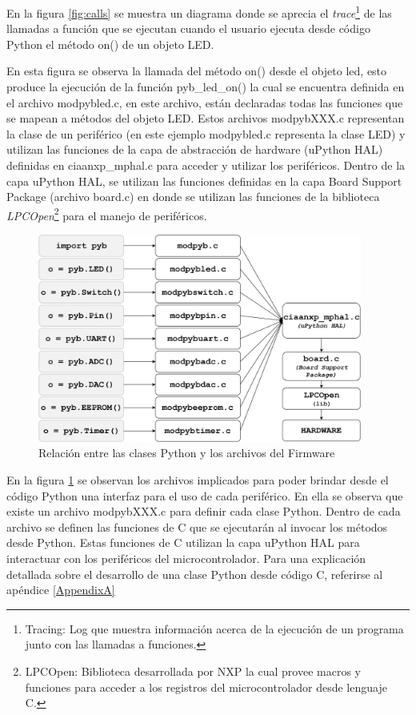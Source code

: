 En la figura \ref{fig:calls} se muestra un diagrama donde se aprecia el \textit{trace}\footnote{Tracing: Log que muestra información acerca de la ejecución de un programa junto con las llamadas a funciones.} de las llamadas a función que se ejecutan cuando el usuario ejecuta desde código Python el método on() de un objeto LED.

En esta figura se observa la llamada del método on() desde el objeto led, esto produce la ejecución de la función pyb\_led\_on() la cual se encuentra definida en el archivo modpybled.c, en este archivo, están declaradas todas las funciones que se mapean a métodos del objeto LED.
Estos archivos modpybXXX.c representan la clase de un periférico (en este ejemplo modpybled.c representa la clase LED) y utilizan las funciones de la capa de abstracción de hardware (uPython HAL) definidas en ciaanxp\_mphal.c para acceder y utilizar los periféricos.
Dentro de la capa uPython HAL, se utilizan las funciones definidas en la capa Board Support Package (archivo board.c) en donde se utilizan las funciones de la biblioteca \textit{LPCOpen}\footnote{LPCOpen: Biblioteca desarrollada por NXP la cual provee macros y funciones para acceder a los registros del microcontrolador desde lenguaje C.} para el manejo de periféricos.

\begin{figure}[ht]
  \centering
    \includegraphics[width=0.95\textwidth]{Figures/fig_files}
  \caption{Relación entre las clases Python y los archivos del Firmware}
  \label{fig:files}
\end{figure}

En la figura \ref{fig:files} se observan los archivos implicados para poder brindar desde el código Python una interfaz para el uso de cada periférico. En ella se observa que existe un archivo modpybXXX.c para definir cada clase Python. Dentro de cada archivo se definen las funciones de C que se ejecutarán al invocar los métodos desde Python. Estas funciones de C utilizan la capa uPython HAL para interactuar con los periféricos del microcontrolador.
Para una explicación detallada sobre el desarrollo de una clase Python desde código C, referirse al apéndice \ref{AppendixA}

